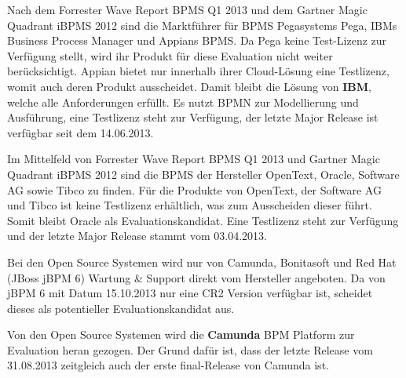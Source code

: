 \medskip\noindent Nach dem Forrester Wave Report BPMS Q1 2013 und dem Gartner Magic Quadrant iBPMS 2012 sind die Marktführer für BPMS Pegasystems Pega, IBMs Business Process Manager und Appians BPMS. Da Pega keine Test-Lizenz zur Verfügung stellt, wird ihr Produkt für diese Evaluation nicht weiter berücksichtigt. Appian bietet nur innerhalb ihrer Cloud-Lösung eine Testlizenz, womit auch deren Produkt ausscheidet. Damit bleibt die Lösung von \textbf{IBM}, welche alle Anforderungen erfüllt. Es nutzt \ac{BPMN} zur Modellierung und Ausführung, eine Testlizenz steht zur Verfügung, der letzte Major Release ist verfügbar seit dem 14.06.2013. \cite{IBMCorporation.2013}

\medskip\noindent Im Mittelfeld von Forrester Wave Report BPMS Q1 2013 und Gartner Magic Quadrant iBPMS 2012 sind die \ac{BPMS} der Hersteller OpenText, Oracle, Software AG sowie Tibco zu finden. Für die Produkte von OpenText, der Software AG und Tibco ist keine Testlizenz erhältlich, was zum Ausscheiden dieser führt. Somit bleibt Oracle als Evaluationskandidat. Eine Testlizenz steht zur Verfügung und der letzte Major Release stammt vom 03.04.2013. \cite{OracleRelease.2013}

\medskip\noindent Bei den Open Source Systemen wird nur von Camunda, Bonitasoft und Red Hat (JBoss jBPM 6) Wartung \& Support direkt vom Hersteller angeboten. Da von jBPM 6 mit Datum 15.10.2013 nur eine CR2 Version verfügbar ist, scheidet dieses als potentieller Evaluationskandidat aus. 


\medskip\noindent Von den Open Source Systemen wird die \textbf{Camunda} BPM Platform zur Evaluation heran gezogen. Der Grund dafür ist, dass der letzte Release vom 31.08.2013 \cite{camundaRelease.2013} zeitgleich auch der erste final-Release von Camunda ist.
